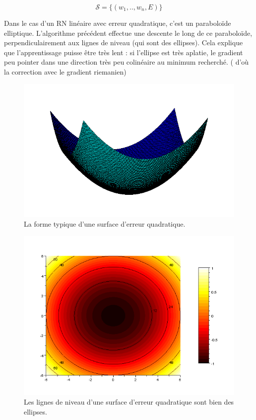 \documentclass{article}
\begin{document}
\[\mathcal S = \{(w_1,..,w_n,E)\}\]

Dans le cas d'un RN linéaire avec erreur quadratique, c'est un paraboloïde elliptique. L'algorithme précédent effectue une descente le long de ce paraboloïde, perpendiculairement aux lignes de niveau (qui sont des ellipses). Cela explique que l'apprentissage puisse être très lent : si l'ellipse est très aplatie, le gradient peu pointer dans une direction très peu colinéaire au minimum recherché. ( d'où la correction avec le gradient riemanien)

\newpage
\begin{figure}[!h]\centering
\includegraphics[scale=0.5]{Surfaceerreur.png}
\caption{La forme typique d'une surface d'erreur quadratique.}
\label{fig:Surface}
\end{figure}

\begin{figure}[!h]\centering
\includegraphics[scale=0.5]{level.png}
\caption{Les lignes de niveau d'une surface d'erreur quadratique sont bien des ellipses. }
\label{fig:level}
\end{figure}
\end{document}
